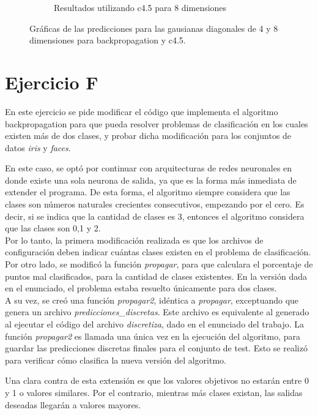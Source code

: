 \documentclass[12pt, a4paper]{article}
\begin{document}
\begin{figure}
\begin{subfigure}[b]{0.45\textwidth}
        \caption{Resultados utilizando c4.5 para 8 dimensiones}  
    \end{subfigure}

   \caption{Gráficas de las predicciones para las gausianas diagonales de 4 y 8 dimensiones para backpropagation y c4.5.}
\end{figure}


\section*{Ejercicio F}

En este ejercicio se pide modificar el código que implementa el algoritmo backpropagation para que pueda resolver problemas de clasificación en los cuales existen más de dos clases, y probar dicha modificación para los conjuntos de datos \textit{iris} y \textit{faces}.  

\bigskip

En este caso, se optó por continuar con arquitecturas de redes neuronales en donde existe una sola neurona de salida, ya que es la forma más inmediata de extender el programa. De esta forma, el algoritmo siempre considera que las clases son números naturales crecientes consecutivos, empezando por el cero. Es decir, si se indica que la cantidad de clases es 3, entonces el algoritmo considera que las clases son 0,1 y 2.\\
Por lo tanto, la primera modificación realizada es que los archivos de configuración deben indicar cuántas clases existen en el problema de clasificación. \\
Por otro lado, se modificó la función \textit{propagar}, para que calculara el porcentaje de puntos mal clasificados, para la cantidad de clases existentes. En la versión dada en el enunciado, el problema estaba resuelto únicamente para dos clases.\\
A su vez, se creó una función \textit{propagar2}, idéntica a \textit{propagar}, exceptuando que genera un archivo \textit{predicciones\_discretas}. Este archivo es equivalente al generado al ejecutar el código del archivo \textit{discretiza}, dado en el enunciado del trabajo. La función \textit{propagar2} es llamada una única vez en la ejecución del algoritmo, para guardar las predicciones discretas finales para el conjunto de test. Esto se realizó para verificar cómo clasifica la nueva versión del algoritmo.

\bigskip
Una clara contra de esta extensión es que los valores objetivos no estarán entre 0 y 1 o valores similares. Por el contrario, mientras más clases existan, las salidas deseadas llegarán a valores mayores. 
\end{document}
